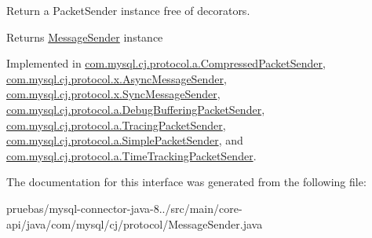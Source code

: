 Return a Packet\+Sender instance free of decorators.

\begin{DoxyReturn}{Returns}
\mbox{\hyperlink{interfacecom_1_1mysql_1_1cj_1_1protocol_1_1_message_sender}{Message\+Sender}} instance 
\end{DoxyReturn}


Implemented in \mbox{\hyperlink{classcom_1_1mysql_1_1cj_1_1protocol_1_1a_1_1_compressed_packet_sender_a06ec74d67adf77498b1f95148cd59323}{com.\+mysql.\+cj.\+protocol.\+a.\+Compressed\+Packet\+Sender}}, \mbox{\hyperlink{classcom_1_1mysql_1_1cj_1_1protocol_1_1x_1_1_async_message_sender_ad00ea2b9a6d74feb32a301410fc829f0}{com.\+mysql.\+cj.\+protocol.\+x.\+Async\+Message\+Sender}}, \mbox{\hyperlink{classcom_1_1mysql_1_1cj_1_1protocol_1_1x_1_1_sync_message_sender_a7228daf021acf6d8505108645317825d}{com.\+mysql.\+cj.\+protocol.\+x.\+Sync\+Message\+Sender}}, \mbox{\hyperlink{classcom_1_1mysql_1_1cj_1_1protocol_1_1a_1_1_debug_buffering_packet_sender_a00c2c86d5ab855c81addbc039560b66b}{com.\+mysql.\+cj.\+protocol.\+a.\+Debug\+Buffering\+Packet\+Sender}}, \mbox{\hyperlink{classcom_1_1mysql_1_1cj_1_1protocol_1_1a_1_1_tracing_packet_sender_a57670e7bdafb2dd88cb711fb7e60266d}{com.\+mysql.\+cj.\+protocol.\+a.\+Tracing\+Packet\+Sender}}, \mbox{\hyperlink{classcom_1_1mysql_1_1cj_1_1protocol_1_1a_1_1_simple_packet_sender_a2fa36445cf29dff6e32000dc6c95c831}{com.\+mysql.\+cj.\+protocol.\+a.\+Simple\+Packet\+Sender}}, and \mbox{\hyperlink{classcom_1_1mysql_1_1cj_1_1protocol_1_1a_1_1_time_tracking_packet_sender_a26a673b209acd1d181f62dceed280750}{com.\+mysql.\+cj.\+protocol.\+a.\+Time\+Tracking\+Packet\+Sender}}.



The documentation for this interface was generated from the following file\+:\begin{DoxyCompactItemize}
\item 
pruebas/mysql-\/connector-\/java-\/8../src/main/core-\/api/java/com/mysql/cj/protocol/Message\+Sender.\+java\end{DoxyCompactItemize}
